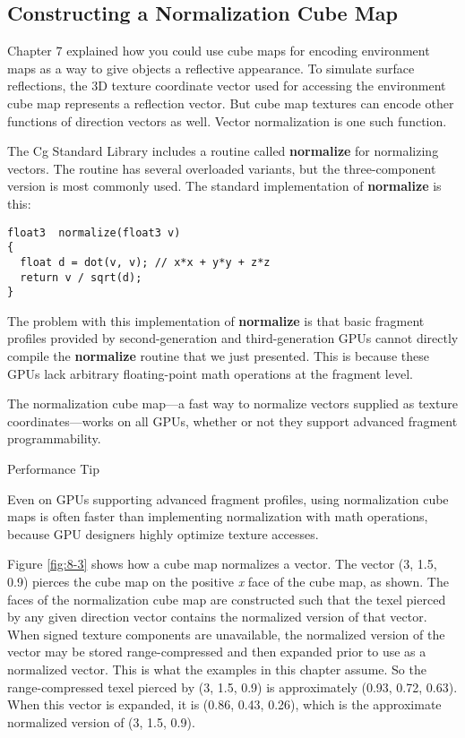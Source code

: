 \documentclass[../main.tex]{subfiles}
\begin{document}
\subsection*{Constructing a Normalization Cube Map}

Chapter 7 explained how you could use cube maps for encoding environment maps as a way to give objects a reflective appearance. To simulate surface reflections, the 3D texture coordinate vector used for accessing the environment cube map represents a reflection vector. But cube map textures can encode other functions of direction vectors as well. Vector normalization is one such function.

The Cg Standard Library includes a routine called \textbf{normalize} for normalizing vectors. The routine has several overloaded variants, but the three-component version is most commonly used. The standard implementation of \textbf{normalize} is this:

\FloatBarrier
\begin{lstlisting}
float3  normalize(float3 v)
{
  float d = dot(v, v); // x*x + y*y + z*z
  return v / sqrt(d);
}
\end{lstlisting}
\FloatBarrier

The problem with this implementation of \textbf{normalize} is that basic fragment profiles provided by second-generation and third-generation GPUs cannot directly compile the \textbf{normalize} routine that we just presented. This is because these GPUs lack arbitrary floating-point math operations at the fragment level.

The normalization cube map—a fast way to normalize vectors supplied as texture coordinates—works on all GPUs, whether or not they support advanced fragment programmability.

\begin{framed}
Performance Tip

Even on GPUs supporting advanced fragment profiles, using normalization cube maps is often faster than implementing normalization with math operations, because GPU designers highly optimize texture accesses.
\end{framed}

Figure \ref{fig:8-3} shows how a cube map normalizes a vector. The vector (3, 1.5, 0.9) pierces the cube map on the positive \textit{x} face of the cube map, as shown. The faces of the normalization cube map are constructed such that the texel pierced by any given direction vector contains the normalized version of that vector. When signed texture components are unavailable, the normalized version of the vector may be stored range-compressed and then expanded prior to use as a normalized vector. This is what the examples in this chapter assume. So the range-compressed texel pierced by (3, 1.5, 0.9) is approximately (0.93, 0.72, 0.63). When this vector is expanded, it is (0.86, 0.43, 0.26), which is the approximate normalized version of (3, 1.5, 0.9).
\end{document}
